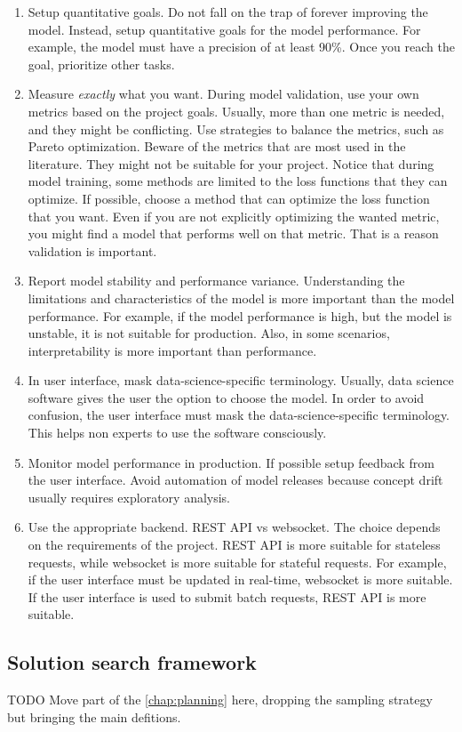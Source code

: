 \begin{enumerate}
  \item Setup quantitative goals.  Do not fall on the trap of forever improving the model.
    Instead, setup quantitative goals for the model performance.  For example, the model
    must have a precision of at least 90\%.  Once you reach the goal, prioritize other
    tasks.
  \item Measure \emph{exactly} what you want.  During model validation, use your own
    metrics based on the project goals.  Usually, more than one metric is needed, and they
    might be conflicting.  Use strategies to balance the metrics, such as Pareto
    optimization.  Beware of the metrics that are most used in the literature.  They might not
    be suitable for your project.  Notice that during model training, some methods are
    limited to the loss functions that they can optimize.  If possible, choose a method
    that can optimize the loss function that you want.  Even if you are not explicitly
    optimizing the wanted metric, you might find a model that performs well on that metric.
    That is a reason validation is important.
  \item Report model stability and performance variance.  Understanding the limitations
    and characteristics of the model is more important than the model performance.  For
    example, if the model performance is high, but the model is unstable, it is not
    suitable for production.  Also, in some scenarios, interpretability is more important than
    performance.
  \item In user interface, mask data-science-specific terminology.  Usually, data science
    software gives the user the option to choose the model.  In order to avoid confusion,
    the user interface must mask the data-science-specific terminology.  This helps non
    experts to use the software consciously.
  \item Monitor model performance in production.  If possible setup feedback from the user
    interface.  Avoid automation of model releases because concept drift usually requires
    exploratory analysis.
  \item Use the appropriate backend.  REST API vs websocket.  The choice depends on the
    requirements of the project.  REST API is more suitable for stateless requests, while
    websocket is more suitable for stateful requests.  For example, if the user interface
    must be updated in real-time, websocket is more suitable.  If the user interface is
    used to submit batch requests, REST API is more suitable.
\end{enumerate}

\subsection{Solution search framework}

TODO Move part of the \cref{chap:planning} here, dropping the sampling
strategy but bringing the main defitions.
